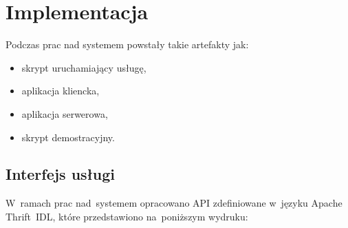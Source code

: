 \chapter[Implementacja][Implementacja]{Implementacja}
Podczas prac nad systemem powstały takie artefakty jak:
\begin{itemize}
  \item skrypt uruchamiający usługę,
  \item aplikacja kliencka,
  \item aplikacja serwerowa,
  \item skrypt demostracyjny.
\end{itemize}

\section[Interfejs usługi][Interfejs usługi]{Interfejs usługi}
W~ramach prac nad~systemem opracowano API zdefiniowane w~języku Apache
Thrift~IDL, które przedstawiono na~poniższym wydruku:

